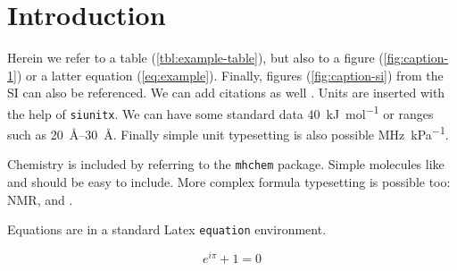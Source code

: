 

\section{Introduction}

Herein we refer to a table (\cref{tbl:example-table}), but also to a figure
(\cref{fig:caption-1}) or a latter equation (\cref{eq:example}). Finally,
figures (\cref{fig:caption-si}) from the SI can also be referenced. We can add
citations as well \citep{example}. Units are inserted with the help of
\texttt{siunitx}. We can have some standard data \SI{40}{\kilo\joule\per\mol} or
ranges such as \SIrange{20}{30}{\angstrom}. Finally simple unit typesetting is
also possible \si{\mega\hertz\per\kilo\pascal}. 

Chemistry is included by referring to the \texttt{mhchem} package. Simple
molecules like  and  should be easy to include. More complex
formula typesetting is possible too:  NMR,  and
.

Equations are in a standard Latex \texttt{equation} environment.

\begin{equation}\label{eq:example}
    e^{i\pi} + 1 = 0
\end{equation}

\lipsum[1-4]{}